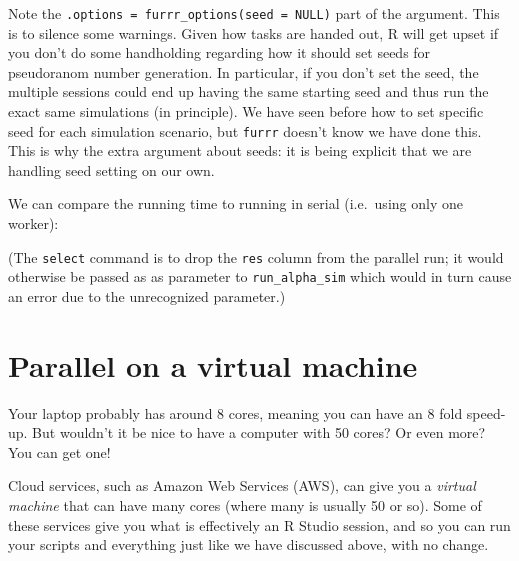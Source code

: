 \documentclass[
]{book}
\newenvironment{Shaded}{\begin{snugshade}}{\end{snugshade}}
\newcommand{\AttributeTok}[1]{\textcolor[rgb]{0.13,0.29,0.53}{#1}}
\newcommand{\FunctionTok}[1]{\textcolor[rgb]{0.13,0.29,0.53}{\textbf{#1}}}
\newcommand{\NormalTok}[1]{#1}
\newcommand{\OtherTok}[1]{\textcolor[rgb]{0.56,0.35,0.01}{#1}}
\newcommand{\SpecialCharTok}[1]{\textcolor[rgb]{0.81,0.36,0.00}{\textbf{#1}}}
\begin{document}
Note the \texttt{.options\ =\ furrr\_options(seed\ =\ NULL)} part of the argument.
This is to silence some warnings.
Given how tasks are handed out, R will get upset if you don't do some handholding regarding how it should set seeds for pseudoranom number generation.
In particular, if you don't set the seed, the multiple sessions could end up having the same starting seed and thus run the exact same simulations (in principle).
We have seen before how to set specific seed for each simulation scenario, but \texttt{furrr} doesn't know we have done this.
This is why the extra argument about seeds: it is being explicit that we are handling seed setting on our own.

We can compare the running time to running in serial (i.e.~using only one worker):

\begin{Shaded}
\end{Shaded}

(The \texttt{select} command is to drop the \texttt{res} column from the parallel run; it would otherwise be passed as as parameter to \texttt{run\_alpha\_sim} which would in turn cause an error due to the unrecognized parameter.)

\section{Parallel on a virtual machine}\label{parallel-on-a-virtual-machine}

Your laptop probably has around 8 cores, meaning you can have an 8 fold speed-up.
But wouldn't it be nice to have a computer with 50 cores? Or even more?
You can get one!

Cloud services, such as Amazon Web Services (AWS), can give you a \emph{virtual machine} that can have many cores (where many is usually 50 or so).
Some of these services give you what is effectively an R Studio session, and so you can run your scripts and everything just like we have discussed above, with no change.
\end{document}
